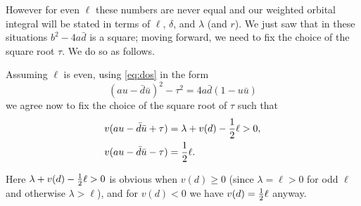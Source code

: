 However for even $\ell$ these numbers are never equal and our weighted orbital
integral will be stated in terms of $\ell$, $\delta$, and $\lambda$ (and $r$).
We just saw that in these situations $b^2 - 4 a \bar d$ is a square;
moving forward, we need to fix the choice of the square root $\tau$.
We do so as follows.
\begin{definition}
  Assuming $\ell$ is even, using \eqref{eq:dos} in the form
  \[ (au-\bar d \bar u)^2 - \tau^2 = 4a\bar d(1- u\bar u) \]
  we agree now to fix the choice of the square root of $\tau$ such that
  \begin{equation}
    \begin{aligned}
      v(au-\bar d \bar u + \tau) &= \lambda + v(d) - \frac{1}{2} \ell > 0, \\
      v(au-\bar d \bar u - \tau) &= \frac{1}{2} \ell.
    \end{aligned}
    \label{eq:tau_choice}
  \end{equation}
\end{definition}
Here $\lambda + v(d) - \frac{1}{2} \ell > 0$ is obvious when $v(d) \ge 0$
(since $\lambda = \ell > 0$ for odd $\ell$ and otherwise $\lambda > \ell$),
and for $v(d) < 0$ we have $v(d) = \frac{1}{2} \ell$ anyway.

